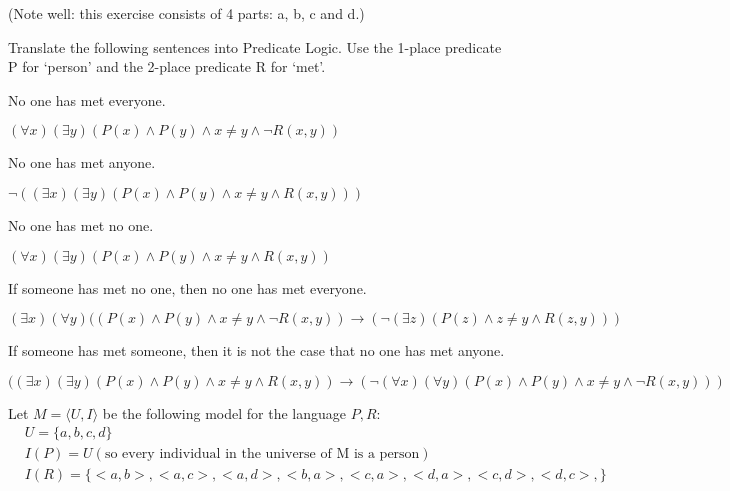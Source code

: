 \begin{QandA}
	\item (Note well: this exercise consists of 4 parts: a, b, c and d.)
	\begin{QandA}
		\item Translate the following sentences into Predicate Logic. Use the 1-place predicate P for ‘person’ and the 2-place predicate R for `met’.
		\begin{QandA}
			\item No one has met everyone.
			\begin{answered}
				$(\forall x)(\exists y)(P(x) \land P(y) \land x \ne y \land \neg R(x,y))$
			\end{answered}
			\item No one has met anyone.
			\begin{answered}
				$\neg ((\exists x)(\exists y)(P(x) \land P(y) \land x \ne y \land R(x,y)))$
			\end{answered}
			\item No one has met no one.
			\begin{answered}
				$(\forall x)(\exists y)(P(x) \land P(y) \land x \ne y \land R(x,y))$
			\end{answered}
			\item If someone has met no one, then no one has met everyone.
			\begin{answered}
				$(\exists x)(\forall y)((P(x) \land P(y) \land x \ne y \land \neg R(x,y)) \rightarrow 
				(\neg (\exists z)(P(z) \land z \ne y \land R(z,y)))$
			\end{answered}
			\item If someone has met someone, then it is not the case that no one has met anyone.
			\begin{answered}
				$((\exists x)(\exists y)(P(x) \land P(y) \land x \ne y \land R(x,y)) \rightarrow 
				(\neg (\forall x)(\forall y)(P(x) \land P(y) \land x \ne y \land \neg R(x,y)))$
			\end{answered}
		\end{QandA}
		\item Let $M = \langle U,I \rangle$ be the following model for the language ${P,R}$:
		\begin{align*}
			  & U = \lbrace a,b,c,d \rbrace                                                   \\
			  & I(P) = U (\text{so every individual in the universe of M is a person})        \\
			  & I(R) = \lbrace <a,b>, <a,c>, <a,d>, <b,a>, <c,a>, <d,a>, <c,d>, <d,c>,\rbrace 
		\end{align*}

\end{QandA}
\end{QandA}
